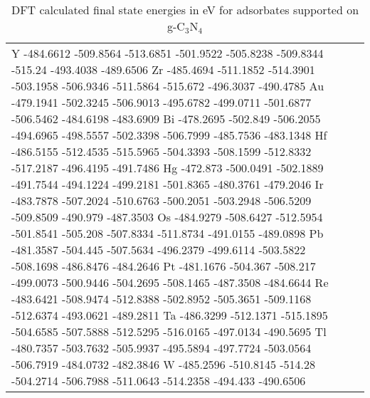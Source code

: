\begin{table}[h]
\begin{tabular}{lr}
      Y 	-484.6612	-509.8564	-513.6851	-501.9522	-505.8238	-509.8344	-515.24		-493.4038	-489.6506
      Zr	-485.4694	-511.1852	-514.3901	-503.1958	-506.9346	-511.5864	-515.672	-496.3037	-490.4785
      Au	-479.1941	-502.3245	-506.9013	-495.6782	-499.0711	-501.6877	-506.5462	-484.6198	-483.6909
      Bi	-478.2695	-502.849	-506.2055	-494.6965	-498.5557	-502.3398	-506.7999	-485.7536	-483.1348
      Hf	-486.5155	-512.4535	-515.5965	-504.3393	-508.1599	-512.8332	-517.2187	-496.4195	-491.7486
      Hg	-472.873	-500.0491	-502.1889	-491.7544	-494.1224	-499.2181	-501.8365	-480.3761	-479.2046
      Ir	-483.7878	-507.2024	-510.6763	-500.2051	-503.2948	-506.5209	-509.8509	-490.979	-487.3503
      Os	-484.9279	-508.6427	-512.5954	-501.8541	-505.208	-507.8334	-511.8734	-491.0155	-489.0898
      Pb	-481.3587	-504.445	-507.5634	-496.2379	-499.6114	-503.5822	-508.1698	-486.8476	-484.2646
      Pt	-481.1676	-504.367	-508.217	-499.0073	-500.9446	-504.2695	-508.1465	-487.3508	-484.6644
      Re	-483.6421	-508.9474	-512.8388	-502.8952	-505.3651	-509.1168	-512.6374	-493.0621	-489.2811
      Ta	-486.3299	-512.1371	-515.1895	-504.6585	-507.5888	-512.5295	-516.0165	-497.0134	-490.5695
      Tl	-480.7357	-503.7632	-505.9937	-495.5894	-497.7724	-503.0564	-506.7919	-484.0732	-482.3846
      W	  -485.2596	-510.8145	-514.28		-504.2714	-506.7988	-511.0643	-514.2358	-494.433	-490.6506
      \hline
    \end{tabular}
    \caption{DFT calculated final state energies in eV for adsorbates supported on g-C$_3$N$_4$}
    \label{si_table4}
\end{table}


